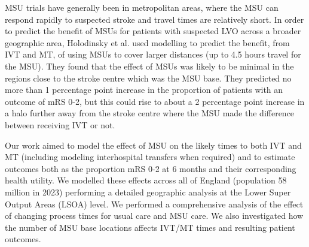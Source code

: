 
MSU trials have generally been in metropolitan areas, where the MSU can respond rapidly to suspected stroke and travel times are relatively short. In order to predict the benefit of MSUs for patients with suspected LVO across a broader geographic area, Holodinsky et al. \cite{holodinsky_jessalyn_k_what_2020} used modelling to predict the benefit, from IVT and MT, of using MSUs to cover larger distances (up to 4.5 hours travel for the MSU). They found that the effect of MSUs was likely to be minimal in the regions close to the stroke centre which was the MSU base. They predicted no more than 1 percentage point increase in the proportion of patients with an outcome of mRS 0-2, but this could rise to about a 2 percentage point increase in a halo further away from the stroke centre where the MSU made the difference between receiving IVT or not.


Our work aimed to model the effect of MSU on the likely times to both IVT and MT (including modeling interhospital transfers when required) and to estimate outcomes both as the proportion mRS 0-2 at 6 months and their corresponding health utility. We modelled these effects across  all of England (population 58 million in 2023) performing a detailed geographic analysis at the Lower Super Output Areas (LSOA) level. We performed a comprehensive analysis of the effect of changing process times for usual care and MSU care. We also investigated how the number of MSU base locations affects IVT/MT times and resulting patient outcomes.